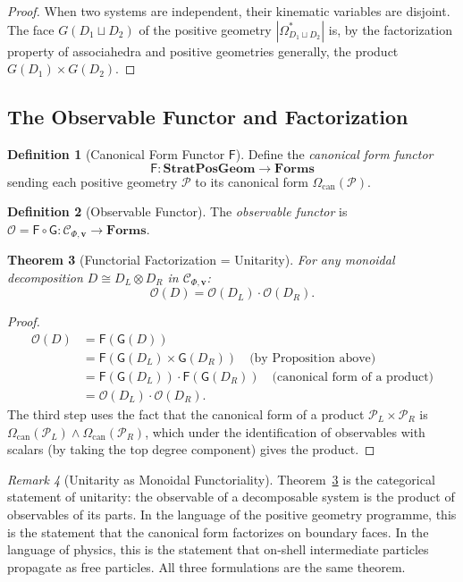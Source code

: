 \documentclass[12pt, oneside]{amsart}
\theoremstyle{plain}
\newtheorem{theorem}{Theorem}[section]
\theoremstyle{definition}
\newtheorem{definition}[theorem]{Definition}
\theoremstyle{remark}
\newtheorem{remark}[theorem]{Remark}
\newcommand{\OmKS}{\Omega}
\newcommand{\CF}{\Omega_{\mathrm{can}}}
\newcommand{\SPG}{\mathbf{StratPosGeom}}
\newcommand{\Forms}{\mathbf{Forms}}
\newcommand{\Ccat}{\mathcal{C}_{\Phi,\mathbf{v}}}
\newcommand{\Gfun}{\mathsf{G}}
\newcommand{\Ffun}{\mathsf{F}}
\newcommand{\Ofun}{\mathcal{O}}
\begin{document}
\begin{proof}
When two systems are independent, their kinematic variables are disjoint. The face $G(D_1 \sqcup D_2)$ of the positive geometry $|\OmKS^*_{D_1 \sqcup D_2}|$ is, by the factorization property of associahedra and positive geometries generally, the product $G(D_1) \times G(D_2)$.
\end{proof}

\subsection{The Observable Functor and Factorization}

\begin{definition}[Canonical Form Functor $\Ffun$]
Define the \emph{canonical form functor}
\[
  \Ffun: \SPG \to \Forms
\]
sending each positive geometry $\mathcal{P}$ to its canonical form $\CF(\mathcal{P})$.
\end{definition}

\begin{definition}[Observable Functor]
The \emph{observable functor} is $\Ofun = \Ffun \circ \Gfun: \Ccat \to \Forms$.
\end{definition}

\begin{theorem}[Functorial Factorization = Unitarity]
\label{thm:functorial-factorization}
For any monoidal decomposition $D \cong D_L \otimes D_R$ in $\Ccat$:
\[
  \Ofun(D) = \Ofun(D_L) \cdot \Ofun(D_R).
\]
\end{theorem}

\begin{proof}
\begin{align*}
  \Ofun(D) &= \Ffun(\Gfun(D)) \\
           &= \Ffun(\Gfun(D_L) \times \Gfun(D_R)) \quad \text{(by Proposition above)} \\
           &= \Ffun(\Gfun(D_L)) \cdot \Ffun(\Gfun(D_R)) \quad \text{(canonical form of a product)} \\
           &= \Ofun(D_L) \cdot \Ofun(D_R).
\end{align*}
The third step uses the fact that the canonical form of a product $\mathcal{P}_L \times \mathcal{P}_R$ is $\CF(\mathcal{P}_L) \wedge \CF(\mathcal{P}_R)$, which under the identification of observables with scalars (by taking the top degree component) gives the product.
\end{proof}

\begin{remark}[Unitarity as Monoidal Functoriality]
Theorem~\ref{thm:functorial-factorization} is the categorical statement of unitarity: the observable of a decomposable system is the product of observables of its parts. In the language of the positive geometry programme, this is the statement that the canonical form factorizes on boundary faces. In the language of physics, this is the statement that on-shell intermediate particles propagate as free particles. All three formulations are the same theorem.
\end{remark}
\end{document}
